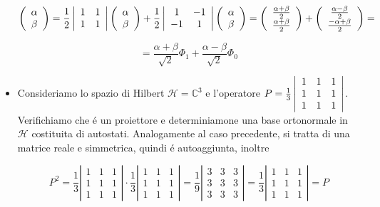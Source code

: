 \begin{itemize}
	$$\left( \begin{array}{c} \alpha \\ \beta \end{array} \right) = \frac{1}{2} \left| \begin{array}{c c} 1 & 1 \\ 1 & 1 \end{array} \right| \left( \begin{array}{c} \alpha \\ \beta \end{array} \right) + \frac{1}{2} \left| \begin{array}{c c} 1 & -1 \\ -1 & 1 \end{array} \right| \left( \begin{array}{c} \alpha \\ \beta \end{array} \right) = \left( \begin{array}{c} \frac{\alpha+\beta}{2} \\ \frac{\alpha+\beta}{2} \end{array} \right) + \left( \begin{array}{c} \frac{\alpha-\beta}{2} \\ \frac{-\alpha+\beta}{2} \end{array} \right) = $$
	
	$$=\frac{\alpha+\beta}{\sqrt{2}} \Phi_{1} + \frac{\alpha-\beta}{\sqrt{2}} \Phi_{0}$$

	\item Consideriamo lo spazio di Hilbert $\mathcal{H}={\mathbb{C}}^{3}$ e l'operatore $P = \frac{1}{3} \left| \begin{array}{c c c} 1 & 1 & 1 \\ 1 & 1 & 1 \\ 1 & 1 & 1 \end{array} \right|$. Verifichiamo che \'e un proiettore e determiniamone una base ortonormale in $\mathcal{H}$ costituita di autostati.
	Analogamente al caso precedente, si tratta di una matrice reale e simmetrica, quindi \'e autoaggiunta, inoltre
	
	$$P^{2}={\frac{1}{3}}\left|\begin{array}{ccc}1&1&1\\ 1&1&1\\ 1&1&1\end{array}\right|\cdot{\frac{1}{3}}\left|\begin{array}{ccc}1&1&1\\ 1&1&1\\ 1&1&1\end{array}\right|={\frac{1}{9}}\left|\begin{array}{ccc}3&3&3\\ 3&3&3\\ 3&3&3\end{array}\right|={\frac{1}{3}}\left|\begin{array}{ccc}1&1&1\\ 1&1&1\\ 1&1&1\end{array}\right| = P$$
	

\end{itemize}
